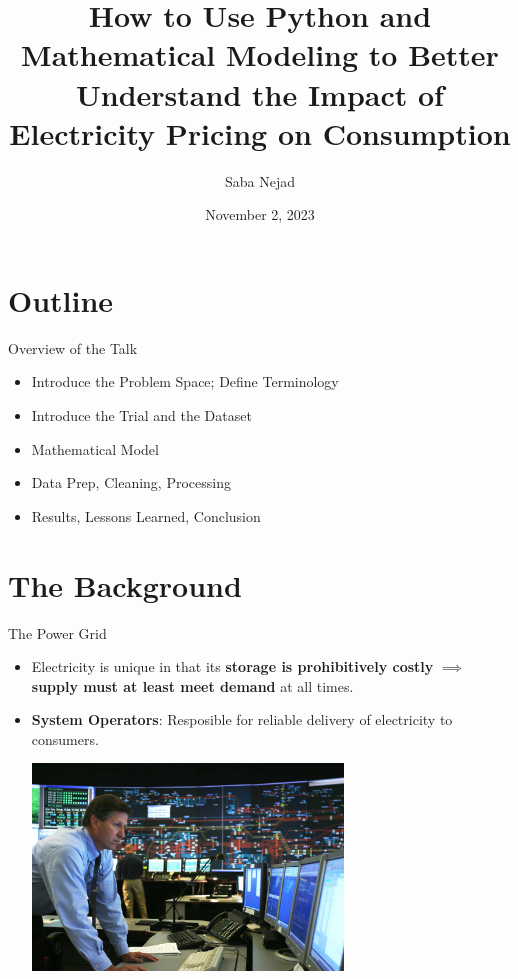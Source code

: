 \documentclass{beamer}
\title{How to Use Python and Mathematical Modeling to Better Understand the Impact of Electricity Pricing on Consumption}
\date{November 2, 2023}
\author{Saba Nejad}
\institute{PyData NYC 2023}
\begin{document}
\maketitle

\section{Outline}

\begin{frame}{Overview of the Talk}
  \begin{itemize}
  \item Introduce the Problem Space; Define Terminology
  \item Introduce the Trial and the Dataset
  \item Mathematical Model
  \item Data Prep, Cleaning, Processing
  \item Results, Lessons Learned, Conclusion
  \end{itemize}
\end{frame}

\section{The Background}

\begin{frame}{The Power Grid}
  \begin{itemize}
    \item<+-> Electricity is unique in that its \textbf{storage is prohibitively costly} $\implies$ \textbf{supply must at least meet demand} at all times. 
    \item<+-> \textbf{System Operators}: Resposible for reliable delivery of electricity to consumers.
    \vspace{0.2cm}
    \begin{center}
      \includegraphics[width=0.65\textwidth]{images/iso-control-room.png}
    \end{center}
  \end{itemize}
\end{frame}
\end{document}
